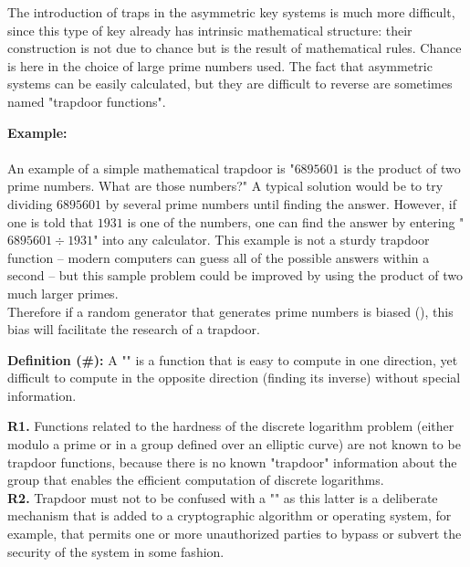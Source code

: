 	The introduction of traps in the asymmetric key systems is much more difficult, since this type of key already has intrinsic mathematical structure: their construction is not due to chance but is the result of mathematical rules. Chance is here in the choice of large prime numbers used. The fact that asymmetric systems can be easily calculated, but they are difficult to reverse are sometimes named "trapdoor functions".

	\begin{tcolorbox}[colframe=black,colback=white,sharp corners]
	\textbf{{\Large {}}Example:}\\\\
	An example of a simple mathematical trapdoor is "$6895601$ is the product of two prime numbers. What are those numbers?" A typical solution would be to try dividing $6895601$ by several prime numbers until finding the answer. However, if one is told that $1931$ is one of the numbers, one can find the answer by entering "$6895601\div 1931$" into any calculator. This example is not a sturdy trapdoor function – modern computers can guess all of the possible answers within a second – but this sample problem could be improved by using the product of two much larger primes.\\
	
	Therefore if a random generator that generates prime numbers is biased (), this bias will facilitate the research of a trapdoor.
	\end{tcolorbox}
	
	\textbf{Definition (\#\mydef):} A "" is a function that is easy to compute in one direction, yet difficult to compute in the opposite direction (finding its inverse) without special information.
	
	\begin{tcolorbox}[title=Remarks,colframe=black,arc=10pt]
	\textbf{R1.} Functions related to the hardness of the discrete logarithm problem (either modulo a prime or in a group defined over an elliptic curve) are not known to be trapdoor functions, because there is no known "trapdoor" information about the group that enables the efficient computation of discrete logarithms.\\
	
	\textbf{R2.} Trapdoor must not to be confused with a "" as this latter is a deliberate mechanism that is added to a cryptographic algorithm or operating system, for example, that permits one or more unauthorized parties to bypass or subvert the security of the system in some fashion.
	\end{tcolorbox}
	
